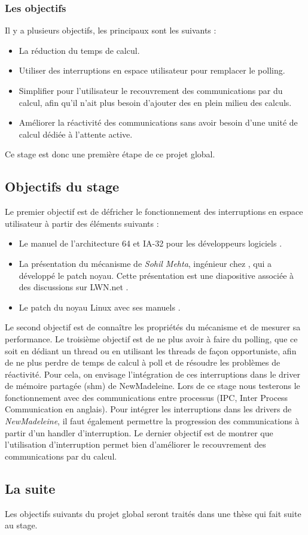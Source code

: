 \subsubsection{Les objectifs}

Il y a plusieurs objectifs, les principaux sont les suivants :

\begin{itemize}
  \item La réduction du temps de calcul.
  \item Utiliser des interruptions en espace utilisateur pour remplacer le polling.
  \item Simplifier pour l'utilisateur le recouvrement des communications par du calcul, afin qu'il n'ait plus besoin d'ajouter des  en plein milieu des calculs.
  \item Améliorer la réactivité des communications sans avoir besoin d'une unité de calcul dédiée à l'attente active.
\end{itemize}

Ce stage est donc une première étape de ce projet global.

\subsection{Objectifs du stage}

Le premier objectif est de défricher le fonctionnement des interruptions en espace utilisateur à partir des éléments suivants :
\begin{itemize}
  \item Le manuel \intel{} de l'architecture 64 et IA-32 pour les développeurs logiciels \cite{intelSoftwareDevMan}.
  \item La présentation du mécanisme de \emph{Sohil Mehta}, ingénieur chez \intel{}, qui a développé le patch noyau. Cette présentation est une diapositive associée à des discussions sur LWN.net \cite{uintrLWN}.
  \item Le patch du noyau Linux \cite{intelUintrLinuxKernel} avec ses manuels \cite{intelUintrLinuxKernelMan}.
\end{itemize}

Le second objectif est de connaître les propriétés du mécanisme et de mesurer sa performance.
Le troisième objectif est de ne plus avoir à faire du polling, que ce soit en dédiant un thread ou en utilisant les threads de façon opportuniste, afin de ne plus perdre de temps de calcul à poll et de résoudre les problèmes de réactivité.
Pour cela, on envisage l'intégration de ces interruptions dans le driver de mémoire partagée (shm) de NewMadeleine.
Lors de ce stage nous testerons le fonctionnement avec des communications entre processus (IPC, Inter Process Communication en anglais).
Pour intégrer les interruptions dans les drivers de \emph{NewMadeleine}, il faut également permettre la progression des communications à partir d'un handler d'interruption.
Le dernier objectif est de montrer que l'utilisation d'interruption permet bien d'améliorer le recouvrement des communications par du calcul.

\subsection{La suite}

Les objectifs suivants du projet global seront traités dans une thèse qui fait suite au stage.
